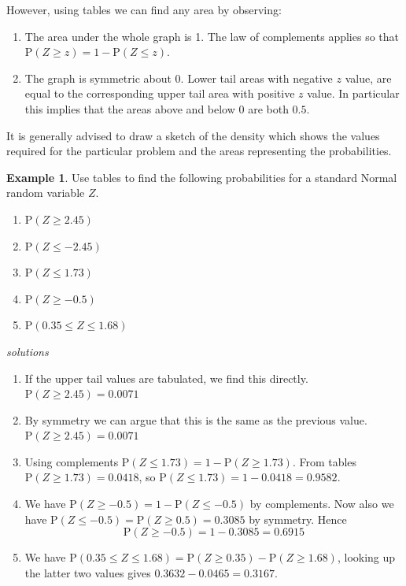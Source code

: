 \documentclass[
]{book}
\theoremstyle{definition}
\theoremstyle{definition}
\newtheorem{example}{Example}[chapter]
\theoremstyle{definition}
\theoremstyle{definition}
\theoremstyle{remark}
\begin{document}
However, using tables we can find any area by observing:

\begin{enumerate}
\def\labelenumi{\arabic{enumi}.}
\item
  The area under the whole graph is 1. The law of complements applies so that \(\text{P}(Z\geq z)= 1-\text{P}(Z\leq z)\).
\item
  The graph is symmetric about \(0\). Lower tail areas with negative \(z\) value, are equal to the corresponding upper tail area with positive \(z\) value. In particular this implies that the areas above and below \(0\) are both \(0.5\).
\end{enumerate}

It is generally advised to draw a sketch of the density which shows the values required for the particular problem and the areas representing the probabilities.

\begin{example}

Use tables to find the following probabilities for a standard Normal random variable \(Z\).

\begin{enumerate}
\def\labelenumi{\arabic{enumi}.}
\item
  \(\text{P}(Z\geq 2.45)\)
\item
  \(\text{P}(Z\leq -2.45)\)
\item
  \(\text{P}(Z\leq 1.73)\)
\item
  \(\text{P}(Z\geq -0.5)\)
\item
  \(\text{P}(0.35\leq Z\leq 1.68)\)
\end{enumerate}

\end{example}

\emph{solutions}

\begin{enumerate}
\def\labelenumi{\arabic{enumi}.}
\item
  If the upper tail values are tabulated, we find this directly.
  \(\text{P}(Z\geq 2.45) = 0.0071\)
\item
  By symmetry we can argue that this is the same as the previous value.
  \(\text{P}(Z\geq 2.45) = 0.0071\)
\item
  Using complements \(\text{P}(Z\leq 1.73)= 1-\text{P}(Z\geq 1.73)\). From tables \(\text{P}(Z\geq 1.73)= 0.0418\), so \(\text{P}(Z\leq 1.73)= 1- 0.0418 = 0.9582\).
\item
  We have \(\text{P}(Z\geq -0.5) = 1 - \text{P}(Z\leq -0.5)\) by complements. Now also we have \(\text{P}(Z\leq -0.5) = \text{P}(Z\geq 0.5) = 0.3085\) by symmetry. Hence \[\text{P}(Z\geq -0.5) = 1 - 0.3085 = 0.6915 \]
\item
  We have \(\text{P}(0.35\leq Z\leq 1.68) = \text{P}(Z\geq 0.35)-\text{P}(Z\geq 1.68)\), looking up the latter two values gives \(0.3632 - 0.0465 = 0.3167.\)
\end{enumerate}
\end{document}
